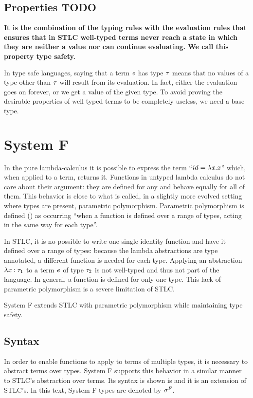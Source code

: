\subsection{Properties TODO}
\textbf{It is the combination of the typing rules with the evaluation rules that ensures that in STLC well-typed terms never reach a state in which they are neither a value nor can continue evaluating. We call this property type safety.}

In type safe languages, saying that a term $\mathit{e}$ has type $\mathit{\tau}$ means that no values of a type other than $\mathit{\tau}$ will result from its evaluation. In fact, either the evaluation goes on forever, or we get a value of the given type. To avoid proving the desirable properties of well typed terms to be completely useless, we need a base type.
\section{System F}
In the pure lambda-calculus it is possible to express the term ``$id=\lambda\mathit{x}.\mathit{x}$'' which, when applied to a term, returns it. Functions in untyped lambda calculus do not care about their argument: they are defined for any and behave equally for all of them. This behavior is close to what is called, in a slightly more evolved setting where types are present, parametric polymorphism. Parametric polymorphism is defined (\cite{adhoc}) as occurring ``when a function is defined over a range of types, acting in the same way for each type''.

In STLC, it is no possible to write one single identity function and have it defined over a range of types: because the lambda abstractions are type annotated, a different function is needed for each type. Applying an abstraction $\lambda \mathit{x} : \mathit{\tau}_1$ to a term $\mathit{e}$ of type $\mathit{\tau}_2$ is not well-typed and thus not part of the language. In general, a function is defined for only one type. This lack of parametric polymorphism is a severe limitation of STLC.

System F \cite{systemf,girard} extends STLC with parametric polymorphism while maintaining type safety.

\subsection{Syntax}
In order to enable functions to apply to terms of multiple types, it is necessary to abstract terms over types. System F supports this behavior in a similar manner to STLC's abstraction over terms. Its syntax is shown is  and it is an extension of STLC's. In this text, System F types are denoted by $\mathit{\sigma^F}$.

